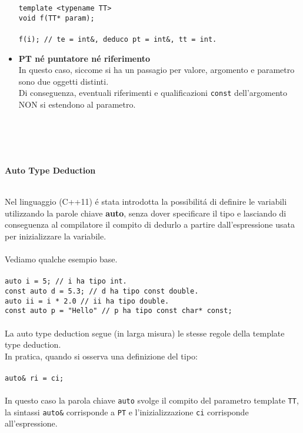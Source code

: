 \documentclass{article}
\begin{document}
\begin{itemize}
\texttt{template <typename TT> \\ void f(TT* param); \\ \\ f(i); \textcolor{grigio}{// te = int\&, deduco pt = int\&, tt = int.}} \\
\item \textbf{\textcolor{blu}{PT n\'e puntatore n\'e riferimento}}\\In questo caso, siccome si ha un passagio per valore, argomento e parametro sono due oggetti distinti.\\Di conseguenza, eventuali riferimenti e qualificazioni \texttt{const} dell'argomento NON si estendono al parametro.
\\ \\ \\ \\ \\
\end{itemize}
\begin{large}\textbf{\textcolor{blu}{Auto Type Deduction}}\\ \\ \end{large}
Nel linguaggio (C++11) \'e stata introdotta la possibilit\'a di definire le variabili utilizzando la parole chiave \textbf{auto}, senza dover specificare il tipo e lasciando di conseguenza al compilatore il compito di dedurlo a partire dall'espressione usata per inizializzare la variabile.\\ \\ Vediamo qualche esempio base. \\ \\
\texttt{auto i = 5; \textcolor{grigio}{// i ha tipo int.} \\ const auto d = 5.3; \textcolor{grigio}{// d ha tipo const double.}\\ auto ii = i * 2.0 \textcolor{grigio}{// ii ha tipo double.} \\ const auto p = "Hello" \textcolor{grigio}{// p ha tipo const char* const;}} \\ \\ La auto type deduction segue (in larga misura) le stesse regole della template type deduction.\\In pratica, quando si osserva una definizione del tipo: \\ \\ \texttt{auto\& ri = ci;} \\ \\ In questo caso la parola chiave \texttt{auto} svolge il compito del parametro template \texttt{TT}, la sintassi \texttt{auto\&} corrisponde a \texttt{PT} e l'inizializzazione \texttt{ci} corrisponde all'espressione.
\end{document}
